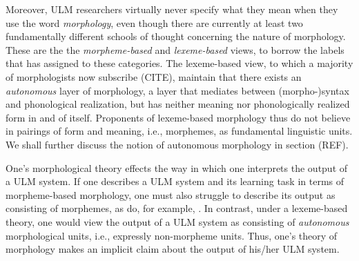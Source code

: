 Moreover, \ac{ULM}  researchers virtually never specify what they mean
when they use the word \emph{morphology}, even though there
are currently at least two fundamentally different schools of thought concerning the nature of morphology. These are the 
the \emph{morpheme-based} and \emph{lexeme-based} views, to borrow the labels that \cite{aronoff:1994} has assigned 
to these categories. The lexeme-based view, to which a majority of morphologists now subscribe (CITE),
maintain that there exists an \emph{autonomous} layer of morphology, a layer that mediates between (morpho-)syntax
and phonological realization, but has neither meaning nor phonologically realized form in and of itself. Proponents
of lexeme-based morphology thus do not believe in pairings of form and meaning, i.e., morphemes, as fundamental linguistic
units. We shall further discuss the notion of autonomous morphology in section (REF). %

One's morphological theory effects the way in which one interprets the output of a \ac{ULM}  system. 
If one describes a \ac{ULM}  system and its learning task in terms of morpheme-based morphology, one must also struggle to 
describe its output as consisting of morphemes, as do, for example, \cite{creutz-and-lagus:2007,creutz-and-lagus:2005}. 
In contrast, under a lexeme-based theory, 
one would view the output of a \ac{ULM}  system as consisting of \emph{autonomous} morphological units, i.e., 
expressly non-morpheme units. 
Thus, one's theory of morphology makes an implicit claim about the output of his/her \ac{ULM}  system.

